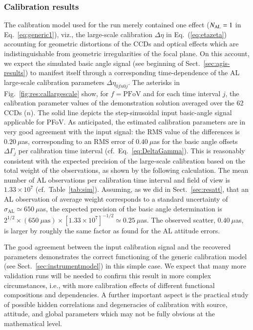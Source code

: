 \documentclass[structabstract]{aa}
\begin{document}
\subsubsection{Calibration results\label{sec:rescal}}

The calibration model used for the run merely contained one effect
($N_{\mbox{\scriptsize AL}}=1$ in Eq.~\ref{eq:generic1}),
viz., the large-scale calibration $\Delta\eta$ in Eq.~(\ref{eq:etazeta})
accounting for geometric distortions of the CCDs and optical effects
which are indistinguishable from geometric irregularities of the focal plane.
On this account, we expect the simulated basic angle signal (see
beginning of Sect.~\ref{sec:agis-results}) to manifest itself through
a corresponding time-dependence of the AL large-scale calibration 
parameters $\Delta\eta_{0fn0j}$.
The asterisks in Fig.~\ref{fig:res:callargescale} show, for $f=\mbox{PFoV}$ 
and for each time interval $j$, the calibration parameter values of the 
demonstration solution averaged 
over the 62 CCDs ($n$). The solid line depicts the step-sinusoidal input 
basic-angle signal applicable for PFoV. As anticipated, the estimated 
calibration parameters are in very good agreement with the input signal: 
the RMS value of the differences is $0.20~\mu$as, corresponding to an 
RMS error of $0.40~\mu$as for the basic angle offsets $\Delta\Gamma_j$ 
per calibration time interval (cf.\ Eq.~\ref{eq:DeltaGamma}). This is 
reasonably consistent with the expected precision of the large-scale
calibration based on the total weight of the observations, as shown
by the following calculation. The mean number of AL observations per
calibration time interval and field of view is $1.33\times 10^7$
(cf.\ Table~\ref{tab:sim}). Assuming, as we did in Sect.~\ref{sec:resatt}, 
that an AL observation of average weight corresponds to a standard
uncertainty of $\sigma_\text{AL}\simeq 650~\mu$as, the expected precision
of the basic angle determination is 
$2^{1/2}\times (650~\mu\text{as})\times [1.33\times 10^7]^{-1/2}\simeq 0.25~\mu$as.
The observed scatter, $0.40~\mu$as, is larger by roughly the same
factor as found for the AL attitude errors. 

The good agreement between the input calibration signal and the
recovered parameters demonstrates the correct functioning of the generic 
calibration model (see Sect.~\ref{sec:instrumentmodel}) in 
this simple case. We expect that many more validation runs will
be needed to confirm this result in more complex circumstances, i.e., with
more calibration effects of different functional compositions and
dependencies. A further important aspect is the practical study of possible
hidden correlations and degeneracies of calibration with source,
attitude, and global parameters which may not be fully obvious at the
mathematical level.
\end{document}
